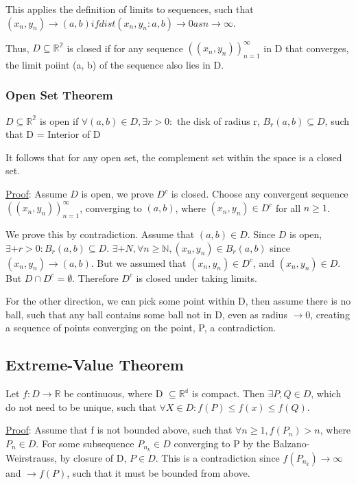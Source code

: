 This applies the definition of limits to sequences, such that $(x_n, y_n) \to (a, b) if dist(x_n, y_n: a, b) \to 0 as n \to \infty$.

Thus, $D \subseteq \mathbb{R^2}$ is closed if for any sequence $((x_n, y_n))^\infty_{n=1}$ in D that converges, the limit poiint (a, b) of the sequence also lies in D.

\subsubsection{Open Set Theorem}
$D \subseteq \mathbb{R^2}$ is open if $\forall (a, b) \in D, \exists r > 0:$ the disk of radius r, $B_r(a, b) \subseteq D$, such that D = Interior of D

It follows that for any open set, the complement set within the space is a closed set.

\underline{Proof}:
Assume $D$ is open, we prove $D^c$ is closed. Choose any convergent sequence
$((x_n, y_n))_{n = 1}^\infty$, converging to $(a, b)$, where $(x_n, y_n) \in
D^c$ for all $n \geq 1$.

We prove this by contradiction. Assume that $(a, b) \in D$. Since $D$ is open,
$\exists+ r > 0:B_r(a, b)\subseteq D$. $\exists+ N, \forall n \geq
\mathbb{N}, (x_n, y_n) \in B_r(a, b)$ since $(x_n, y_n)\to(a,b)$. But we
assumed that $(x_n, y_n) \in D^c$, and $(x_n, y_n) \in D$. But $D \cap D^c =
\emptyset$. Therefore $D^c$ is closed under taking limits.

For the other direction, we can pick some point within D, then assume there is no ball, such that any ball contains some ball not in D, even as radius $\to 0$, creating a sequence of points converging on the point, P, a contradiction.

\subsection{Extreme-Value Theorem}
Let $f:D \to \mathbb{R}$ be continuous, where D $\subseteq \mathbb{R^d}$ is compact. Then $\exists P, Q \in D$, which do not need to be unique, such that $\forall X \in D: f(P) \leq f(x) \leq f(Q)$.

\underline{Proof}:
Assume that f is not bounded above, such that $\forall n \geq 1, f(P_n) > n$, where $P_n \in D$. For some subsequence $P_{n_k} \in D$ converging to P by the Balzano-Weirstrauss, by closure of D, $P \in D$. This is a contradiction since $f(P_{n_k}) \to \infty$ and $\to f(P)$, such that it must be bounded from above.

